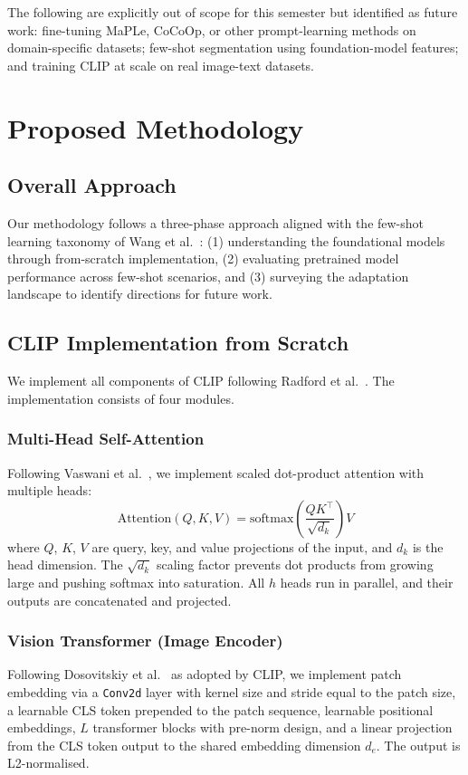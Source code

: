 \documentclass{iutbscthesis}
\begin{document}
The following are explicitly out of scope for this semester but identified as future work: fine-tuning MaPLe, CoCoOp, or other prompt-learning methods on domain-specific datasets; few-shot segmentation using foundation-model features; and training CLIP at scale on real image-text datasets.

\chapter{Proposed Methodology} \label{chapter:proposed}

\section{Overall Approach}

Our methodology follows a three-phase approach aligned with the few-shot learning taxonomy of Wang et al.\ \cite{wang2020fslsurvey}: (1) understanding the foundational models through from-scratch implementation, (2) evaluating pretrained model performance across few-shot scenarios, and (3) surveying the adaptation landscape to identify directions for future work.

\section{CLIP Implementation from Scratch}

We implement all components of CLIP following Radford et al.\ \cite{radford2021clip}. The implementation consists of four modules.

\subsection{Multi-Head Self-Attention}
Following Vaswani et al.\ \cite{vaswani2017attention}, we implement scaled dot-product attention with multiple heads:
\begin{equation}
    \mathrm{Attention}(Q,K,V) = \mathrm{softmax}\!\left(\frac{QK^{\top}}{\sqrt{d_k}}\right)V
\end{equation}
where $Q$, $K$, $V$ are query, key, and value projections of the input, and $d_k$ is the head dimension. The $\sqrt{d_k}$ scaling factor prevents dot products from growing large and pushing softmax into saturation. All $h$ heads run in parallel, and their outputs are concatenated and projected.

\subsection{Vision Transformer (Image Encoder)}
Following Dosovitskiy et al.\ \cite{dosovitskiy2021vit} as adopted by CLIP, we implement patch embedding via a \texttt{Conv2d} layer with kernel size and stride equal to the patch size, a learnable CLS token prepended to the patch sequence, learnable positional embeddings, $L$ transformer blocks with pre-norm design, and a linear projection from the CLS token output to the shared embedding dimension $d_e$. The output is L2-normalised.
\end{document}
